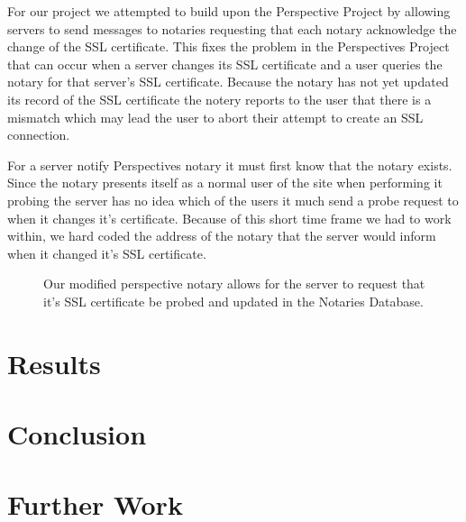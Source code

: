 \documentclass[preprint,review,12pt]{elsarticle}
\begin{document}
For our project we attempted to build upon the Perspective Project by allowing
servers to send messages to notaries requesting that each notary acknowledge
the change of the SSL certificate. This fixes the problem in the Perspectives
Project that can occur when a server changes its SSL certificate and a user
queries the notary for that server's SSL certificate. Because the notary has
not yet updated its record of the SSL certificate the notery reports to the user that
there is a mismatch which may lead the user to abort their attempt to create an
SSL connection.

For a server notify Perspectives notary it must first know that the notary
exists. Since the notary presents itself as a normal user of the site when
performing it probing the server has no idea which of the users it much send a
probe request to when it changes it's certificate. Because of this short time
frame we had to work within, we hard coded the address of the notary that the
server would inform when it changed it's SSL certificate.

\begin{figure}[h]
\caption{Our modified perspective notary allows for the server to request that
    it's SSL certificate be probed and updated in the Notaries Database.}
\end{figure}

\section{Results}
\label{results}

\section{Conclusion}
\label{conclusion}

\section{Further Work}
\label{further work}
\end{document}
